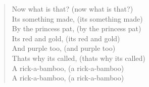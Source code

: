 \begin{verse}
Now what is that? (now what is that?) \\
Its something made, (its something made) \\
By the princess pat, (by the princess pat) \\
Its red and gold, (its red and gold) \\
And purple too, (and purple too) \\
Thats why its called, (thats why its called) \\
A rick-a-bamboo, (a rick-a-bamboo) \\
A rick-a-bamboo, (a rick-a-bamboo) \\
\end{verse}
